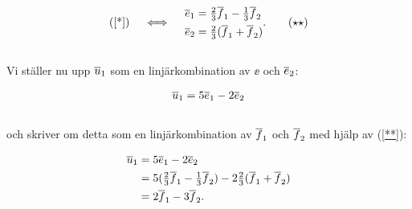 \documentclass{article}
\begin{document}
\begin{gather}
  \text{(\ref{*})} \quad \iff \quad
  \begin{aligned}
    \overline{e}_{1} &= \tfrac{2}{3}\overline{f}_{1} - \tfrac{1}{3}\overline{f}_{2}\\
    \overline{e}_{2} &= \tfrac{2}{3}(\overline{f}_{1} + \overline{f}_{2})
  \end{aligned}\text{.} \tag{$\star\star$}\label{**}
\end{gather}
\\
Vi ställer nu upp $\overline{u}_{1}$ som en linjärkombination av $\ee$ och $\overline{e}_{2}$:

\begin{gather*}
  \overline{u}_{1} = 5\overline{e}_{1} - 2\overline{e}_{2}
\end{gather*}
\\
och skriver om detta som en linjärkombination av $\overline{f}_{1}$ och $\overline{f}_{2}$ med hjälp av (\ref{**}):

\begin{align*}
  \overline{u}_{1} &= 5\overline{e}_{1} - 2\overline{e}_{2}\\
  & = 5(\tfrac{2}{3}\overline{f}_{1} - \tfrac{1}{3}\overline{f}_{2}) - 2\tfrac{2}{3}(\overline{f}_{1} + \overline{f}_{2})\\
  &= 2\overline{f}_{1} - 3\overline{f}_{2}\text{.}
\end{align*}
\end{document}
